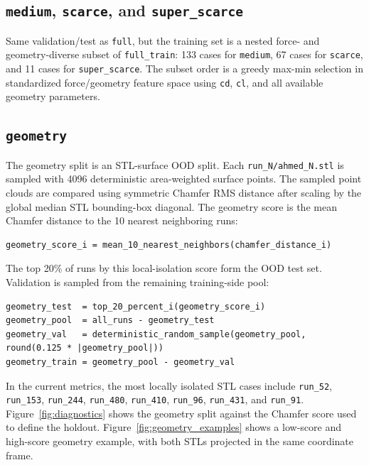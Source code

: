 \documentclass[10pt]{article}
\newcommand{\code}[1]{\texttt{#1}}
\newcommand{\splitkey}[1]{\texttt{#1}}
\begin{document}
\subsection*{\splitkey{medium}, \splitkey{scarce}, and \splitkey{super\_scarce}}

Same validation/test as \splitkey{full}, but the training set is a nested
force- and geometry-diverse subset of \splitkey{full\_train}: 133 cases for
\splitkey{medium}, 67 cases for \splitkey{scarce}, and 11 cases for
\splitkey{super\_scarce}. The subset order is a greedy max-min selection in
standardized force/geometry feature space using \code{cd}, \code{cl}, and all
available geometry parameters.

\subsection*{\splitkey{geometry}}

The geometry split is an STL-surface OOD split. Each \code{run\_N/ahmed\_N.stl}
is sampled with 4096 deterministic area-weighted surface points. The sampled
point clouds are compared using symmetric Chamfer RMS distance after scaling by
the global median STL bounding-box diagonal. The geometry score is the mean
Chamfer distance to the 10 nearest neighboring runs:

\begin{verbatim}
geometry_score_i = mean_10_nearest_neighbors(chamfer_distance_i)
\end{verbatim}

The top 20\% of runs by this local-isolation score form the OOD test set.
Validation is sampled from the remaining training-side pool:

\begin{verbatim}
geometry_test  = top_20_percent_i(geometry_score_i)
geometry_pool  = all_runs - geometry_test
geometry_val   = deterministic_random_sample(geometry_pool, round(0.125 * |geometry_pool|))
geometry_train = geometry_pool - geometry_val
\end{verbatim}

In the current metrics, the most locally isolated STL cases include
\splitkey{run\_52}, \splitkey{run\_153}, \splitkey{run\_244},
\splitkey{run\_480}, \splitkey{run\_410}, \splitkey{run\_96},
\splitkey{run\_431}, and \splitkey{run\_91}. Figure~\ref{fig:diagnostics}
shows the geometry split against the Chamfer score used to define the holdout.
Figure~\ref{fig:geometry_examples} shows a low-score and high-score geometry
example, with both STLs projected in the same coordinate frame.
\end{document}
